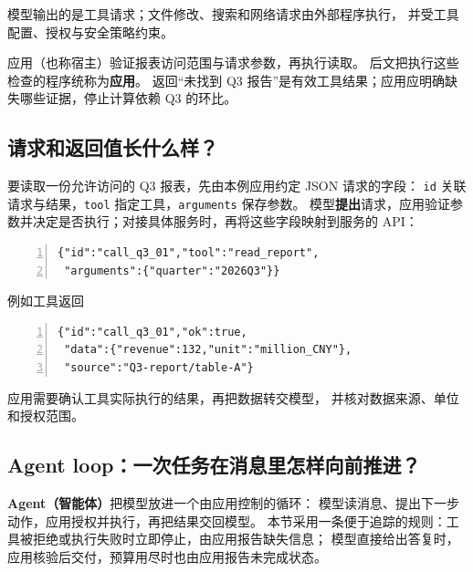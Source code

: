 模型输出的是工具请求；文件修改、搜索和网络请求由外部程序执行，
并受工具配置、授权与安全策略约束。

应用（也称宿主）验证报表访问范围与请求参数，再执行读取。
后文把执行这些检查的程序统称为\textbf{应用}。
返回“未找到 Q3 报告”是有效工具结果；应用应明确缺失哪些证据，停止计算依赖 Q3 的环比。

\subsection{请求和返回值长什么样？}

要读取一份允许访问的 Q3 报表，先由本例应用约定 JSON 请求的字段：
\texttt{id} 关联请求与结果，\texttt{tool} 指定工具，\texttt{arguments} 保存参数。
模型\textbf{提出}请求，应用验证参数并决定是否执行；对接具体服务时，再将这些字段映射到服务的 API：
\begin{tcolorbox}[colback=paper,colframe=linegray,boxrule=.5pt,arc=1mm,left=3mm,right=3mm]
\begin{Verbatim}[numbers=left,numbersep=4pt,fontsize=\footnotesize]
{"id":"call_q3_01","tool":"read_report",
 "arguments":{"quarter":"2026Q3"}}
\end{Verbatim}
\end{tcolorbox}
例如工具返回
\begin{tcolorbox}[colback=paper,colframe=linegray,boxrule=.5pt,arc=1mm,left=3mm,right=3mm]
\begin{Verbatim}[numbers=left,numbersep=4pt,fontsize=\footnotesize]
{"id":"call_q3_01","ok":true,
 "data":{"revenue":132,"unit":"million_CNY"},
 "source":"Q3-report/table-A"}
\end{Verbatim}
\end{tcolorbox}
应用需要确认工具实际执行的结果，再把数据转交模型，
并核对数据来源、单位和授权范围。


\subsection{Agent loop：一次任务在消息里怎样向前推进？}
\label{concept:agent}
\textbf{Agent（智能体）}把模型放进一个由应用控制的循环：
模型读消息、提出下一步动作，应用授权并执行，再把结果交回模型。
本节采用一条便于追踪的规则：工具被拒绝或执行失败时立即停止，由应用报告缺失信息；
模型直接给出答复时，应用核验后交付，预算用尽时也由应用报告未完成状态。

